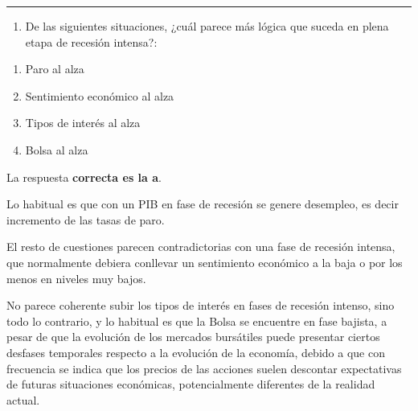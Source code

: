 \documentclass[
  letterpaper,
  DIV=11,
  numbers=noendperiod]{scrreprt}
\providecommand{\tightlist}{%
  \setlength{\itemsep}{0pt}\setlength{\parskip}{0pt}}\usepackage{longtable,booktabs,array}
\begin{document}
\begin{center}\rule{0.5\linewidth}{0.5pt}\end{center}

\begin{enumerate}
\def\labelenumi{\arabic{enumi}.}
\setcounter{enumi}{14}
\tightlist
\item
  De las siguientes situaciones, ¿cuál parece más lógica que suceda en
  plena etapa de recesión intensa?:
\end{enumerate}

\begin{enumerate}
\def\labelenumi{\alph{enumi})}
\item
  Paro al alza
\item
  Sentimiento económico al alza
\item
  Tipos de interés al alza
\item
  Bolsa al alza
\end{enumerate}

\begin{tcolorbox}[enhanced jigsaw, left=2mm, opacityback=0, colback=white, breakable, arc=.35mm, bottomrule=.15mm, rightrule=.15mm, toprule=.15mm, leftrule=.75mm, colframe=quarto-callout-tip-color-frame]
\begin{minipage}[t]{5.5mm}
\textcolor{quarto-callout-tip-color}{\faLightbulb}
\end{minipage}%
\begin{minipage}[t]{\textwidth - 5.5mm}

La respuesta \textbf{correcta es la a}.

Lo habitual es que con un PIB en fase de recesión se genere desempleo,
es decir incremento de las tasas de paro.

El resto de cuestiones parecen contradictorias con una fase de recesión
intensa, que normalmente debiera conllevar un sentimiento económico a la
baja o por los menos en niveles muy bajos.

No parece coherente subir los tipos de interés en fases de recesión
intenso, sino todo lo contrario, y lo habitual es que la Bolsa se
encuentre en fase bajista, a pesar de que la evolución de los mercados
bursátiles puede presentar ciertos desfases temporales respecto a la
evolución de la economía, debido a que con frecuencia se indica que los
precios de las acciones suelen descontar expectativas de futuras
situaciones económicas, potencialmente diferentes de la realidad actual.

\end{minipage}%
\end{tcolorbox}
\end{document}
